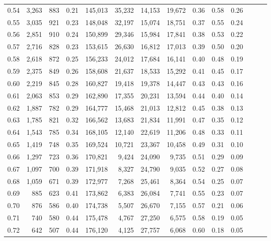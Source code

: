\begin{tabular}{rrrrrrrrrrrrrr}
0.54 &  3,263 &  883 &  0.21 &  145,013 &   35,232 &  14,153 &  19,672 &  0.36 &  0.58 &      0.26 \\
0.55 &  3,035 &  921 &  0.23 &  148,048 &   32,197 &  15,074 &  18,751 &  0.37 &  0.55 &      0.24 \\
0.56 &  2,851 &  910 &  0.24 &  150,899 &   29,346 &  15,984 &  17,841 &  0.38 &  0.53 &      0.22 \\
0.57 &  2,716 &  828 &  0.23 &  153,615 &   26,630 &  16,812 &  17,013 &  0.39 &  0.50 &      0.20 \\
0.58 &  2,618 &  872 &  0.25 &  156,233 &   24,012 &  17,684 &  16,141 &  0.40 &  0.48 &      0.19 \\
0.59 &  2,375 &  849 &  0.26 &  158,608 &   21,637 &  18,533 &  15,292 &  0.41 &  0.45 &      0.17 \\
0.60 &  2,219 &  845 &  0.28 &  160,827 &   19,418 &  19,378 &  14,447 &  0.43 &  0.43 &      0.16 \\
0.61 &  2,063 &  853 &  0.29 &  162,890 &   17,355 &  20,231 &  13,594 &  0.44 &  0.40 &      0.14 \\
0.62 &  1,887 &  782 &  0.29 &  164,777 &   15,468 &  21,013 &  12,812 &  0.45 &  0.38 &      0.13 \\
0.63 &  1,785 &  821 &  0.32 &  166,562 &   13,683 &  21,834 &  11,991 &  0.47 &  0.35 &      0.12 \\
0.64 &  1,543 &  785 &  0.34 &  168,105 &   12,140 &  22,619 &  11,206 &  0.48 &  0.33 &      0.11 \\
0.65 &  1,419 &  748 &  0.35 &  169,524 &   10,721 &  23,367 &  10,458 &  0.49 &  0.31 &      0.10 \\
0.66 &  1,297 &  723 &  0.36 &  170,821 &    9,424 &  24,090 &   9,735 &  0.51 &  0.29 &      0.09 \\
0.67 &  1,097 &  700 &  0.39 &  171,918 &    8,327 &  24,790 &   9,035 &  0.52 &  0.27 &      0.08 \\
0.68 &  1,059 &  671 &  0.39 &  172,977 &    7,268 &  25,461 &   8,364 &  0.54 &  0.25 &      0.07 \\
0.69 &    885 &  623 &  0.41 &  173,862 &    6,383 &  26,084 &   7,741 &  0.55 &  0.23 &      0.07 \\
0.70 &    876 &  586 &  0.40 &  174,738 &    5,507 &  26,670 &   7,155 &  0.57 &  0.21 &      0.06 \\
0.71 &    740 &  580 &  0.44 &  175,478 &    4,767 &  27,250 &   6,575 &  0.58 &  0.19 &      0.05 \\
0.72 &    642 &  507 &  0.44 &  176,120 &    4,125 &  27,757 &   6,068 &  0.60 &  0.18 &      0.05 \\

\end{tabular}
